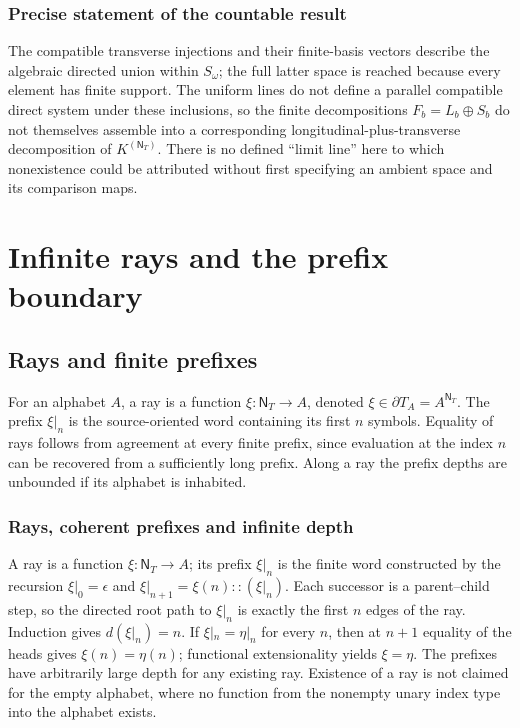 \documentclass[11pt,reqno]{amsart}
\theoremstyle{definition}\newtheorem{definition}[theorem]{Definition}
\theoremstyle{remark}\newtheorem{remark}[theorem]{Remark}
\newcommand{\N}{\mathsf N_T}\newcommand{\Z}{\mathsf Z_T}\newcommand{\Q}{\mathsf Q_T}\newcommand{\RR}{\mathsf R}
\newcommand{\rays}{\partial T}
\begin{document}
\subsubsection*{Precise statement of the countable result}\label{supp:9-5}
The compatible transverse injections and their finite-basis vectors describe the algebraic directed union within $S_\omega$; the full latter space is reached because every element has finite support. The uniform lines do not define a parallel compatible direct system under these inclusions, so the finite decompositions $F_b=L_b\oplus S_b$ do not themselves assemble into a corresponding longitudinal-plus-transverse decomposition of $K^{(\N)}$. There is no defined ``limit line'' here to which nonexistence could be attributed without first specifying an ambient space and its comparison maps.
\medskip

\clearpage
\section{Infinite rays and the prefix boundary}\label{sec:boundary}
\subsection{Rays and finite prefixes}\label{main:sub-31}
For an alphabet $A$, a ray is a function $\xi:\N\to A$, denoted $\xi\in\rays_A=A^{\N}$. The prefix $\xi|_n$ is the source-oriented word containing its first $n$ symbols. Equality of rays follows from agreement at every finite prefix, since evaluation at the index $n$ can be recovered from a sufficiently long prefix. Along a ray the prefix depths are unbounded if its alphabet is inhabited.


\medskip
\subsubsection*{Rays, coherent prefixes and infinite depth}\label{supp:10-1}
A ray is a function $\xi:\N\to A$; its prefix $\xi|_n$ is the finite word constructed by the recursion $\xi|_0=\epsilon$ and $\xi|_{n+1}=\xi(n)::(\xi|_n)$. Each successor is a parent--child step, so the directed root path to $\xi|_n$ is exactly the first $n$ edges of the ray. Induction gives $d(\xi|_n)=n$. If $\xi|_n=\eta|_n$ for every $n$, then at $n+1$ equality of the heads gives $\xi(n)=\eta(n)$; functional extensionality yields $\xi=\eta$. The prefixes have arbitrarily large depth for any existing ray. Existence of a ray is not claimed for the empty alphabet, where no function from the nonempty unary index type into the alphabet exists.
\medskip
\end{document}
